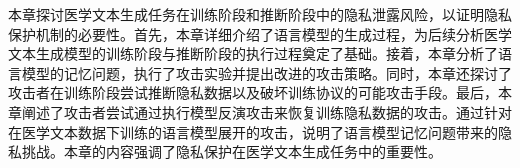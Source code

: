 本章探讨医学文本生成任务在训练阶段和推断阶段中的隐私泄露风险，以证明隐私保护机制的必要性。首先，本章详细介绍了语言模型的生成过程，为后续分析医学文本生成模型的训练阶段与推断阶段的执行过程奠定了基础。接着，本章分析了语言模型的记忆问题，执行了攻击实验并提出改进的攻击策略。同时，本章还探讨了攻击者在训练阶段尝试推断隐私数据以及破坏训练协议的可能攻击手段。最后，本章阐述了攻击者尝试通过执行模型反演攻击来恢复训练隐私数据的攻击。通过针对在医学文本数据下训练的语言模型展开的攻击，说明了语言模型记忆问题带来的隐私挑战。本章的内容强调了隐私保护在医学文本生成任务中的重要性。